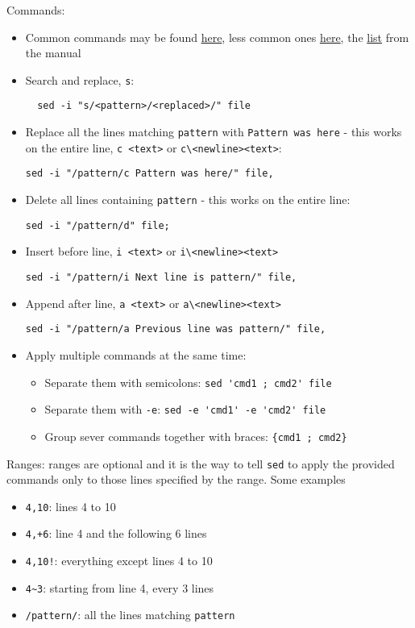 \documentclass[a4paper,12pt,%
              final%
              ]{article}
\begin{document}
Commands:
\begin{itemize}
  \item Common commands may be found \href{https://www.gnu.org/software/sed/manual/sed.html#Common-Commands}{here}, less common ones \href{https://www.gnu.org/software/sed/manual/sed.html#Other-Commands}{here}, the \href{https://www.gnu.org/software/sed/manual/html_node/sed-commands-list.html}{list} from the manual
  \item Search and replace, \verb|s|:
\begin{verbatim}
  sed -i "s/<pattern>/<replaced>/" file
\end{verbatim}
  \item Replace all the lines matching \verb|pattern| with \verb|Pattern was here| - this works on the entire line, \verb|c <text>| or \verb|c\<newline><text>|:
\begin{verbatim}
sed -i "/pattern/c Pattern was here/" file,
\end{verbatim}
  \item Delete all lines containing \verb|pattern| - this works on the entire line:
\begin{verbatim}
sed -i "/pattern/d" file;
\end{verbatim}
  \item Insert before line, \verb|i <text>| or \verb|i\<newline><text>|
\begin{verbatim}
sed -i "/pattern/i Next line is pattern/" file,
\end{verbatim}
  \item Append after line, \verb|a <text>| or \verb|a\<newline><text>|
\begin{verbatim}
sed -i "/pattern/a Previous line was pattern/" file,
\end{verbatim}
  \item Apply multiple commands at the same time:
    \begin{itemize}
      \item Separate them with semicolons: \verb|sed 'cmd1 ; cmd2' file|
      \item Separate them with \verb|-e|: \verb|sed -e 'cmd1' -e 'cmd2' file|
      \item Group sever commands together with braces: \verb|{cmd1 ; cmd2}|
    \end{itemize}
\end{itemize}

Ranges: ranges are optional and it is the way to tell \verb|sed| to apply the provided commands only to those lines specified by the range. Some examples
\begin{itemize}
  \item \verb|4,10|: lines 4 to 10
  \item \verb|4,+6|: line 4 and the following 6 lines
  \item \verb|4,10!|: everything except lines 4 to 10
  \item \verb|4~3|: starting from line 4, every 3 lines
  \item \verb|/pattern/|: all the lines matching \verb|pattern|
\end{itemize}
\end{document}
